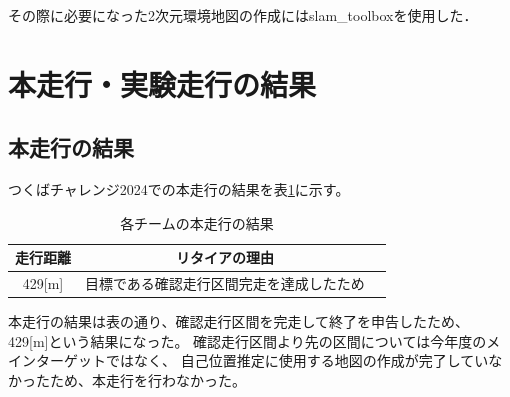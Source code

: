 \documentclass[twocolumn,9pt]{jsproceedings}
\begin{document}
その際に必要になった2次元環境地図の作成にはslam\_toolbox\cite{slam_toolbox}を使用した．



\section{本走行・実験走行の結果}
\subsection{本走行の結果}

つくばチャレンジ2024での本走行の結果を表\ref{MainRun}に示す。

\begin{table}[H]
  \caption{各チームの本走行の結果}
  \label{MainRun}
  \begin{tabular}{|c|c|p{4.0cm}|}
    \hline
    走行距離 & リタイアの理由                                                                                             \\
    \hline
    429[m]   & 目標である確認走行区間完走を達成したため                                                           \\
    \hline
  \end{tabular}
\end{table}



本走行の結果は表の通り、確認走行区間を完走して終了を申告したため、
429[m]という結果になった。
確認走行区間より先の区間については今年度のメインターゲットではなく、
自己位置推定に使用する地図の作成が完了していなかったため、本走行を行わなかった。
\end{document}
